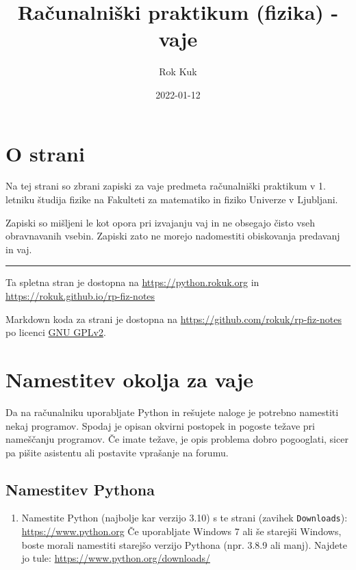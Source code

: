 \documentclass[
]{book}
\title{Računalniški praktikum (fizika) - vaje}
\author{Rok Kuk}
\date{2022-01-12}
\providecommand{\tightlist}{%
  \setlength{\itemsep}{0pt}\setlength{\parskip}{0pt}}
\begin{document}
\maketitle

{
\setcounter{tocdepth}{1}
\tableofcontents
}
\hypertarget{o-strani}{%
\chapter*{O strani}\label{o-strani}}

Na tej strani so zbrani zapiski za vaje predmeta računalniški praktikum v 1. letniku študija fizike na Fakulteti za matematiko in fiziko Univerze v Ljubljani.

Zapiski so mišljeni le kot opora pri izvajanju vaj in ne obsegajo čisto vseh obravnavanih vsebin. Zapiski zato ne morejo nadomestiti obiskovanja predavanj in vaj.

\begin{center}\rule{0.5\linewidth}{0.5pt}\end{center}

Ta spletna stran je dostopna na \url{https://python.rokuk.org} in
\url{https://rokuk.github.io/rp-fiz-notes}

Markdown koda za strani je dostopna na \url{https://github.com/rokuk/rp-fiz-notes}
po licenci \href{https://github.com/rokuk/rp-fiz-notes/blob/main/LICENSE}{GNU GPLv2}.

\hypertarget{namestitev-okolja-za-vaje}{%
\chapter{Namestitev okolja za vaje}\label{namestitev-okolja-za-vaje}}

Da na računalniku uporabljate Python in rešujete naloge je potrebno namestiti
nekaj programov. Spodaj je opisan okvirni postopek in pogoste težave pri nameščanju
programov. Če imate težave, je opis problema dobro pogooglati, sicer pa pišite
asistentu ali postavite vprašanje na forumu.

\hypertarget{namestitev-pythona}{%
\section{Namestitev Pythona}\label{namestitev-pythona}}

\begin{enumerate}
\def\labelenumi{\arabic{enumi}.}
\tightlist
\item
  Namestite Python (najbolje kar verzijo 3.10) s te strani (zavihek \texttt{Downloads}): \url{https://www.python.org}
  Če uporabljate Windows 7 ali še starejši Windows, boste morali namestiti
  starejšo verzijo Pythona (npr. 3.8.9 ali manj). Najdete jo tule: \url{https://www.python.org/downloads/}
\end{enumerate}
\end{document}
